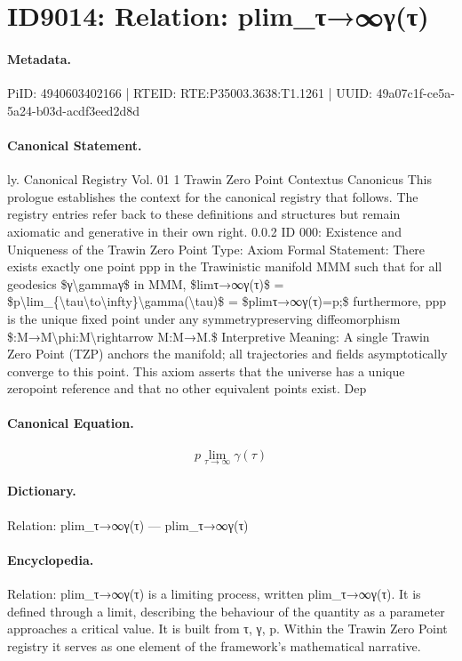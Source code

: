 \section*{ID9014: Relation: plim\_τ→∞γ(τ)}
\paragraph{Metadata.}
PiID: 4940603402166 | RTEID: RTE:P35003.3638:T1.1261 | UUID: 49a07c1f-ce5a-5a24-b03d-acdf3eed2d8d

\paragraph{Canonical Statement.}
ly. Canonical Registry Vol. 01 1 Trawin Zero Point Contextus Canonicus This prologue establishes the context for the canonical registry that follows. The registry entries refer back to these definitions and structures but remain axiomatic and generative in their own right. 0.0.2 ID 000: Existence and Uniqueness of the Trawin Zero Point Type: Axiom Formal Statement: There exists exactly one point ppp in the Trawinistic manifold MMM such that for all geodesics \$γ\textbackslash{}gammaγ\$ in MMM, \$limτ→∞γ(τ)\$ = \$p\textbackslash{}lim\_\{\textbackslash{}tau\textbackslash{}to\textbackslash{}infty\}\textbackslash{}gamma(\textbackslash{}tau)\$ = \$plimτ→∞γ(τ)=p;\$ furthermore, ppp is the unique fixed point under any symmetrypreserving diffeomorphism \$:M→M\textbackslash{}phi:M\textbackslash{}rightarrow M:M→M.\$ Interpretive Meaning: A single Trawin Zero Point (TZP) anchors the manifold; all trajectories and fields asymptotically converge to this point. This axiom asserts that the universe has a unique zeropoint reference and that no other equivalent points exist. Dep

\paragraph{Canonical Equation.}
\[
p\lim_{\tau\to\infty}\gamma(\tau)
\]

\paragraph{Dictionary.}
Relation: plim\_τ→∞γ(τ) — plim\_τ→∞γ(τ)

\paragraph{Encyclopedia.}
Relation: plim\_τ→∞γ(τ) is a limiting process, written plim\_τ→∞γ(τ). It is defined through a limit, describing the behaviour of the quantity as a parameter approaches a critical value. It is built from τ, γ, p. Within the Trawin Zero Point registry it serves as one element of the framework's mathematical narrative.
